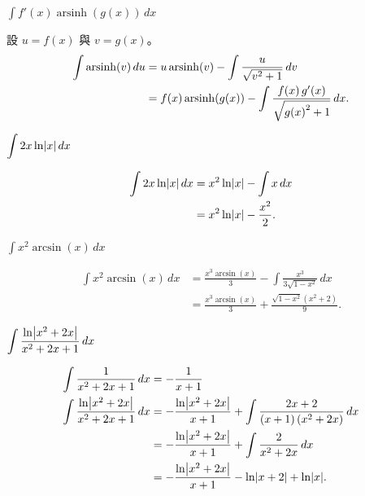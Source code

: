 \documentclass{beamer}
\newcommand{\Left} {\mathopen{}\mathclose\bgroup\left}
\newcommand{\Right}{\aftergroup\egroup\right}
\newcommand{\arsinh}{\operatorname{arsinh}}
\theoremstyle{remark}
\begin{document}
\begin{CJK}{UTF8}{bsmi}
\begin{frame}{$\displaystyle \int f'(x) \arsinh(g(x))\,dx$}
  \begin{solution}
    設 $u = f(x)$ 與 $v = g(x)$。
    \begin{align*}
      \int \arsinh(v)\,du &= u \arsinh(v) - \int \frac{u}{\sqrt{v^2 + 1}}\,dv\\
	&= f(x) \arsinh(g(x)) - \int \frac{f(x)\,g'(x)}{\sqrt{g \Left( x \Right)^2 + 1}}\,dx.
    \end{align*}
  \end{solution}
\end{frame}

\begin{frame}{$\displaystyle \int 2x \ln \Left| x \Right|\,dx$}
  \begin{solution}
    \begin{align*}
      \int 2x \ln \Left| x \Right|\,dx &= x^2 \ln \Left| x \Right| - \int x\,dx\\
	&= x^2 \ln \Left| x \Right| - \frac{x^2}{2}.
    \end{align*}
  \end{solution}
\end{frame}

\begin{frame}{$\displaystyle \int x^2 \arcsin(x)\,dx$}
  \begin{solution}
    \begin{align*}
      \int x^2 \arcsin(x)\,dx &= \frac{x^3 \arcsin(x)}{3} - \int \frac{x^3}{3 \sqrt{1 - x^2}}\,dx\\
	&= \frac{x^3 \arcsin(x)}{3} + \frac{\sqrt{1 - x^2} \left( x^2 + 2 \right)}{9}.
    \end{align*}
  \end{solution}
\end{frame}

\begin{frame}{$\displaystyle \int \frac{\ln \Left| x^2 + 2x \Right|}{x^2 + 2x + 1}\,dx$}
  \begin{solution}
    \begin{align*}
      \int \frac{1}{x^2 + 2x + 1}\,dx &= -\frac{1}{x+1}\\
      \int \frac{\ln \Left| x^2 + 2x \Right|}{x^2 + 2x + 1}\,dx
	&= -\frac{\ln \Left| x^2 + 2x \Right|}{x+1} + \int \frac{2x + 2}{(x+1) \left( x^2 + 2x \right)}\,dx\\
	&= -\frac{\ln \Left| x^2 + 2x \Right|}{x+1} + \int \frac{2}{x^2 + 2x}\,dx\\
	&= -\frac{\ln \Left| x^2 + 2x \Right|}{x+1} - \ln \Left| x+2 \Right| + \ln \Left| x \Right|.
    \end{align*}
  \end{solution}
\end{frame}


\end{CJK}
\end{document}
